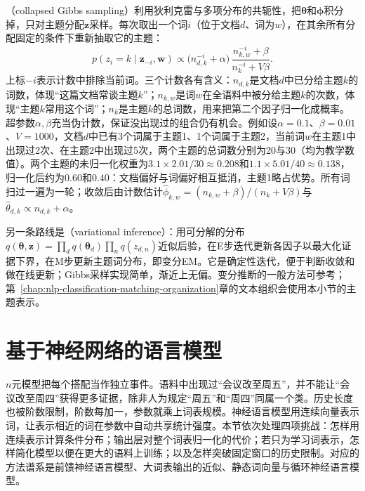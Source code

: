 （collapsed Gibbs sampling）利用狄利克雷与多项分布的共轭性，把$\bm\theta$和$\bm\phi$积分掉，只对主题分配$\bm z$采样。每次取出一个词$i$（位于文档$d$、词为$w$），在其余所有分配固定的条件下重新抽取它的主题：
\begin{equation}
  p(z_i=k\mid\bm z_{-i},\bm w)\propto\bigl(n_{d,k}^{-i}+\alpha\bigr)\,\frac{n_{k,w}^{-i}+\beta}{n_{k}^{-i}+V\beta}.
  \label{eq:nlp-classical-lda-gibbs}
\end{equation}
上标$-i$表示计数中排除当前词。三个计数各有含义：$n_{d,k}$是文档$d$中已分给主题$k$的词数，体现“这篇文档常谈主题$k$”；$n_{k,w}$是词$w$在全语料中被分给主题$k$的次数，体现“主题$k$常用这个词”；$n_k$是主题$k$的总词数，用来把第二个因子归一化成概率。超参数$\alpha,\beta$充当伪计数，保证没出现过的组合仍有机会。例如设$\alpha=0.1$、$\beta=0.01$、$V=1000$，文档$d$中已有3个词属于主题1、1个词属于主题2，当前词$w$在主题1中出现过2次、在主题2中出现过5次，两个主题的总词数分别为20与30（均为教学数值）。两个主题的未归一化权重为$3.1\times2.01/30\approx0.208$和$1.1\times5.01/40\approx0.138$，归一化后约为$0.60$和$0.40$：文档偏好与词偏好相互抵消，主题1略占优势。所有词扫过一遍为一轮；收敛后由计数估计$\hat\phi_{k,w}=(n_{k,w}+\beta)/(n_k+V\beta)$与$\hat\theta_{d,k}\propto n_{d,k}+\alpha$。

另一条路线是（variational inference）：用可分解的分布$q(\bm\theta,\bm z)=\prod_dq(\bm\theta_d)\prod_nq(z_{d,n})$近似后验，在E步迭代更新各因子以最大化证据下界，在M步更新主题词分布，即变分EM。它是确定性迭代，便于判断收敛和做在线更新；Gibbs采样实现简单，渐近上无偏。变分推断的一般方法可参考；第~\ref{chap:nlp-classification-matching-organization}章的文本组织会使用本小节的主题表示。

\section{基于神经网络的语言模型}
\label{sec:nlp-classical-neural}

$n$元模型把每个搭配当作独立事件。语料中出现过“会议改至周五”，并不能让“会议改至周四”获得更多证据，除非人为规定“周五”和“周四”同属一个类。历史长度也被阶数限制，阶数每加一，参数就乘上词表规模。神经语言模型用连续向量表示词，让表示相近的词在参数中自动共享统计强度。本节依次处理四项挑战：怎样用连续表示计算条件分布；输出层对整个词表归一化的代价；若只为学习词表示，怎样简化模型以便在更大的语料上训练；以及怎样突破固定窗口的历史限制。对应的方法谱系是前馈神经语言模型、大词表输出的近似、静态词向量与循环神经语言模型。

